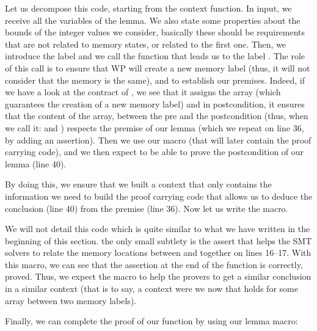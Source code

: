 Let us decompose this code, starting from the context function. In input, we
receive all the variables of the lemma. We also state some properties about the
bounds of the integer values we consider, basically these should be requirements
that are not related to memory states, or related to the first one. Then, we
introduce the label
 and we call the function  that leads
us to the label . The role of this call is to ensure that WP will
create a new memory label (thus, it will not consider that the memory is the
same), and to establish our premises. Indeed, if we have a look at the contract
of , we see that it assigns the array (which
guarantees the creation of a new memory label) and in postcondition, it ensures
that the content of the array, between the pre and the postcondition (thus, when
we call it:  and ) respects the premise of our
lemma (which we repeat on line 36, by adding an assertion). Then we use our
 macro (that will later contain the proof carrying code),
and we then expect to be able to prove the postcondition of our lemma (line 40).



By doing this, we ensure that we built a context that only contains the
information we need to build the proof carrying code that allows us to deduce
the conclusion (line 40) from the premise (line 36). Now let us write the macro.






We will not detail this code which is quite similar to what we have written in
the beginning of this section. the only small subtlety is the assert that helps
the SMT solvers to relate the memory locations between  and
 together on lines 16--17. With this macro, we can see that the
assertion at the end of the function 
is correctly, proved. Thus, we expect the macro to help the provers to get a
similar conclusion in a similar context (that is to say, a context were we now
that  holds for some array between two memory labels).


Finally, we can complete the proof of our function  by using
our lemma macro:






